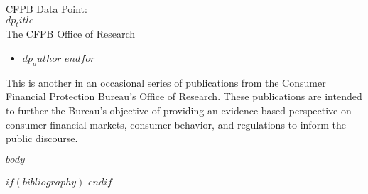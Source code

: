 \documentclass[12pt,letterpaper,twoside]{article}
\begin{document}

\begin{titlepage}
  \thispagestyle{fancy}
  \vspace*{1.5in}
  {\color{white}  \fontsize{38}{38} \selectfont CFPB Data Point:\\[25pt]
  $dp_title$\\[40pt]
  \fontsize{14}{14} \selectfont The CFPB Office of Research\par}
\end{titlepage}

\raggedright
\fancyfoot[R]{}
\begin{itemize}     %
 \renewcommand{\labelitemi}{\scriptsize\FilledSmallSquare}
  $for(dp_author)$
    \item $dp_author$
  $endfor$
\end{itemize}

This is another in an occasional series of publications from the Consumer Financial Protection Bureau's Office of Research. These publications are intended to further the Bureau's objective of providing an evidence-based perspective on consumer financial markets, consumer behavior, and regulations to inform the public discourse.
\newpage

\vspace*{1.5in}
\tableofcontents
\thispagestyle{fancy}

\newpage


$body$

$if(bibliography)$
\newpage
\printbibliography[heading=bibintoc,title={References}]
$endif$

%

\end{document}
